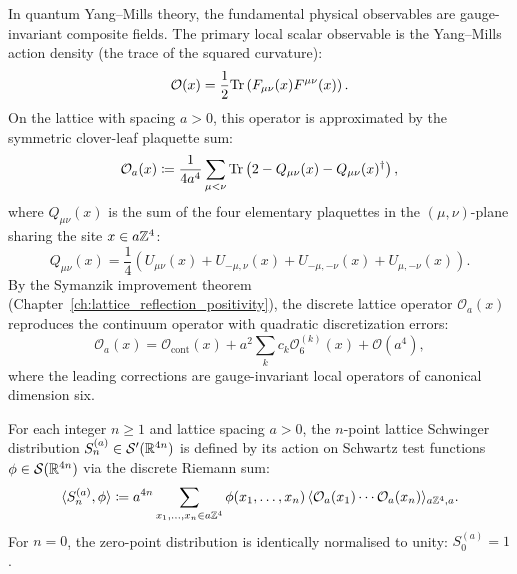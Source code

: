 In quantum Yang--Mills theory, the fundamental physical observables are gauge-invariant composite fields. The primary local scalar observable is the Yang--Mills action density (the trace of the squared curvature):
\begin{equation}
\label{eq:continuum_scalar_observable}
\mathcal{O}(x) = \frac{1}{2} \mathrm{Tr}\left( F_{\mu\nu}(x) F^{\mu\nu}(x) \right).
\end{equation}
On the lattice with spacing $a > 0$, this operator is approximated by the symmetric clover-leaf plaquette sum:
\begin{equation}
\label{eq:clover_plaquette_def}
\mathcal{O}_a(x) \coloneqq \frac{1}{4 a^4} \sum_{\mu < \nu} \mathrm{Tr}\left( 2 - Q_{\mu\nu}(x) - Q_{\mu\nu}(x)^\dagger \right),
\end{equation}
where $Q_{\mu\nu}(x)$ is the sum of the four elementary plaquettes in the $(\mu, \nu)$-plane sharing the site $x \in a\mathbb{Z}^4$:
\begin{equation}
Q_{\mu\nu}(x) = \frac{1}{4} \left( U_{\mu\nu}(x) + U_{-\mu, \nu}(x) + U_{-\mu, -\nu}(x) + U_{\mu, -\nu}(x) \right).
\end{equation}
By the Symanzik improvement theorem (Chapter~\ref{ch:lattice_reflection_positivity}), the discrete lattice operator $\mathcal{O}_a(x)$ reproduces the continuum operator with quadratic discretization errors:
\begin{equation}
\label{eq:symanzik_operator_expansion}
\mathcal{O}_a(x) = \mathcal{O}_{\mathrm{cont}}(x) + a^2 \sum_k c_k \mathcal{O}_6^{(k)}(x) + \mathcal{O}(a^4),
\end{equation}
where the leading corrections are gauge-invariant local operators of canonical dimension six.

\begin{definition}
\label{def:lattice_schwinger}
For each integer $n \ge 1$ and lattice spacing $a > 0$, the $n$-point lattice Schwinger distribution $S_n^{(a)} \in \mathcal{S}'(\mathbb{R}^{4n})$ is defined by its action on Schwartz test functions $\phi \in \mathcal{S}(\mathbb{R}^{4n})$ via the discrete Riemann sum:
\begin{equation}
\label{eq:lattice_schwinger_action}
\langle S_n^{(a)}, \phi \rangle \coloneqq a^{4n} \sum_{x_1, \dots, x_n \in a\mathbb{Z}^4} \phi(x_1, \dots, x_n) \, \langle \mathcal{O}_a(x_1) \cdots \mathcal{O}_a(x_n) \rangle_{a\mathbb{Z}^4, a}.
\end{equation}
For $n = 0$, the zero-point distribution is identically normalised to unity: $S_0^{(a)} = 1$.
\end{definition}

